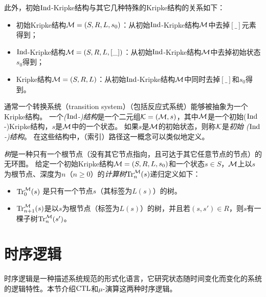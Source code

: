 此外，初始$\textrm{Ind}$-Kripke结构与其它几种特殊的Kripke结构的关系如下：
\begin{itemize}
	\item 初始Kripke结构${\cal M}=(S,R,L,s_0)$：从初始$\textrm{Ind}$-Kripke结构${\cal M}$中去掉$[\_]$元素得到；
	\item $\textrm{Ind}$-Kripke结构${\cal M}=(S,R,L,[\_])$：从初始$\textrm{Ind}$-Kripke结构${\cal M}$中去掉初始状态$s_0$得到；
	\item Kripke结构${\cal M}=(S,R,L)$：从初始$\textrm{Ind}$-Kripke结构${\cal M}$中同时去掉$[\_]$和$s_0$得到。
\end{itemize}
通常一个转换系统（transition system）（包括反应式系统）能够被抽象为一个Kripke结构\cite{Baier:PMC:2008}。
一个\emph{($\textrm{Ind}$-)结构}是一个二元组${\cal K}=({\cal M}, s)$，其中${\cal M}$是一个初始($\textrm{Ind}$-)Kripke结构，$s$是${\cal M}$中的一个状态。
如果$s$是${\cal M}$的初始状态，则称${\cal K}$是{\em 初始 ($\textrm{Ind}$-)结构}。
在这些结构中，（索引）路径这一概念可以类似地定义。
 
 






\emph{树}是一种只有一个根节点（没有其它节点指向，且可达于其它任意节点的节点）的无环图。
给定一个初始Kripke结构${\cal M}=(S,R,L,s_0)$和一个状态$s\in S$，${\cal M}$上以$s$为根节点、深度为$n$（$n\ge 0$）的\emph{计算树}$\textrm{Tr}_n^{{\cal M}}(s)$递归定义如下\cite{browne1988characterizing}：
\begin{itemize}
	\item $\textrm{Tr}_0^{{\cal M}}(s)$ 是只有一个节点$s$（其标签为$L(s)$）的树。
	\item $\textrm{Tr}_{n+1}^{{\cal M}}(s)$是以$s$为根节点（标签为$L(s)$）的树，并且若$(s,s')\in R$，则$s$有一棵子树$\textrm{Tr}_{n}^{{\cal M}}(s')$。
\end{itemize}




\section{时序逻辑}
时序逻辑是一种描述系统规范的形式化语言，它研究状态随时间变化而变化的系统的逻辑特性。本节介绍$\textrm{CTL}$和$\mu$-演算这两种时序逻辑。

